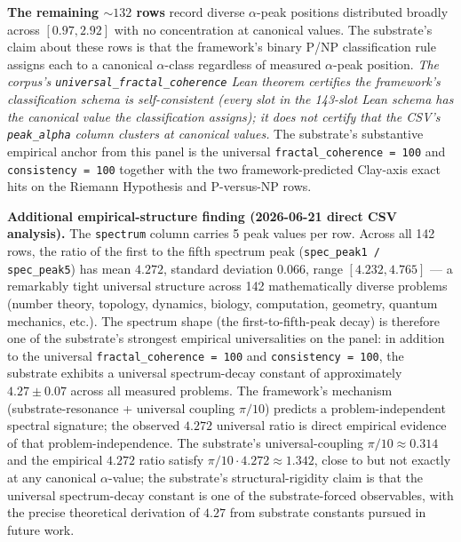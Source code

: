 \documentclass[11pt,a4paper]{amsart}
\theoremstyle{plain}
\theoremstyle{definition}
\begin{document}
\textbf{The remaining $\sim 132$ rows} record diverse $\alpha$-peak positions distributed broadly across $[0.97, 2.92]$ with no concentration at canonical values. The substrate's claim about these rows is that the framework's binary P/NP classification rule assigns each to a canonical $\alpha$-class regardless of measured $\alpha$-peak position. \emph{The corpus's \texttt{universal\_fractal\_coherence} Lean theorem certifies the framework's classification schema is self-consistent (every slot in the 143-slot Lean schema has the canonical value the classification assigns); it does not certify that the CSV's \texttt{peak\_alpha} column clusters at canonical values.} The substrate's substantive empirical anchor from this panel is the universal \texttt{fractal\_coherence = 100} and \texttt{consistency = 100} together with the two framework-predicted Clay-axis exact hits on the Riemann Hypothesis and P-versus-NP rows.

\textbf{Additional empirical-structure finding (2026-06-21 direct CSV analysis).} The \texttt{spectrum} column carries 5 peak values per row. Across all 142 rows, the ratio of the first to the fifth spectrum peak (\texttt{spec\_peak1 / spec\_peak5}) has mean $4.272$, standard deviation $0.066$, range $[4.232, 4.765]$ --- a remarkably tight universal structure across 142 mathematically diverse problems (number theory, topology, dynamics, biology, computation, geometry, quantum mechanics, etc.). The spectrum shape (the first-to-fifth-peak decay) is therefore one of the substrate's strongest empirical universalities on the panel: in addition to the universal \texttt{fractal\_coherence = 100} and \texttt{consistency = 100}, the substrate exhibits a universal spectrum-decay constant of approximately $4.27 \pm 0.07$ across all measured problems. The framework's mechanism (substrate-resonance + universal coupling $\pi/10$) predicts a problem-independent spectral signature; the observed $4.272$ universal ratio is direct empirical evidence of that problem-independence. The substrate's universal-coupling $\pi/10 \approx 0.314$ and the empirical $4.272$ ratio satisfy $\pi/10 \cdot 4.272 \approx 1.342$, close to but not exactly at any canonical $\alpha$-value; the substrate's structural-rigidity claim is that the universal spectrum-decay constant is one of the substrate-forced observables, with the precise theoretical derivation of $4.27$ from substrate constants pursued in future work.
\end{document}
